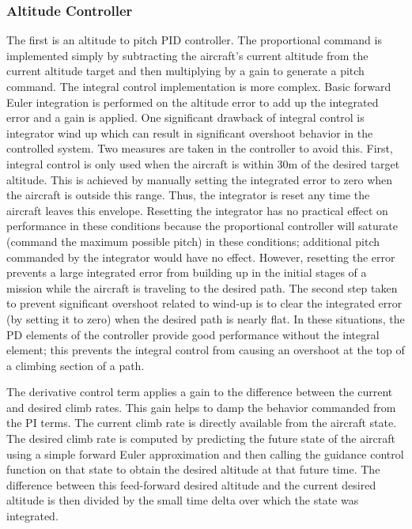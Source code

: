 \documentclass{aiaa}
\begin{document}
\subsubsection{Altitude Controller}
The first is an altitude to pitch PID controller. The proportional command is implemented simply by subtracting the aircraft's current altitude from the current altitude target and then multiplying by a gain to generate a pitch command. 
The integral control implementation is more complex. Basic forward Euler integration is performed on the altitude error to add up the integrated error and a gain is applied. One significant drawback of integral control is integrator wind up which can result in significant overshoot behavior in the controlled system. Two measures are taken in the controller to avoid this. First, integral control is only used when the aircraft is within 30m of the desired target altitude. This is achieved by manually setting the integrated error to zero when the aircraft is outside this range. Thus, the integrator is reset any time the aircraft leaves this envelope. Resetting the integrator has no practical effect on performance in these conditions because the proportional controller will saturate (command the maximum possible pitch) in these conditions; additional pitch commanded by the integrator would have no effect. However, resetting the error prevents a large integrated error from building up in the initial stages of a mission while the aircraft is traveling to the desired path. The second step taken to prevent significant overshoot related to wind-up is to clear the integrated error (by setting it to zero) when the desired path is nearly flat. In these situations, the PD elements of the controller provide good performance without the integral element; this prevents the integral control from causing an overshoot at the top of a climbing section of a path.

The derivative control term applies a gain to the difference between the current and desired climb rates.  This gain helps to damp the behavior commanded from the PI terms. The current climb rate is directly available from the aircraft state. The desired climb rate is computed by predicting the future state of the aircraft using a simple forward Euler approximation and then calling the guidance control function on that state to obtain the desired altitude at that future time. The difference between this feed-forward desired altitude and the current desired altitude is then divided by the small time delta over which the state was integrated.
\end{document}
